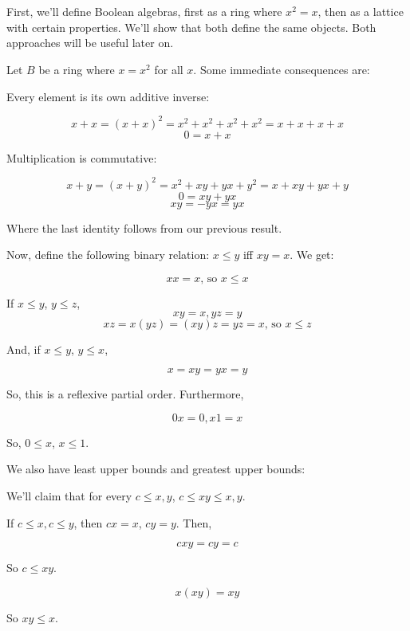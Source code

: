 \documentclass{article}
\title{}
\author{}
\date{}
\begin{document}
  \maketitle

  \section{}

    First, we'll define Boolean algebras, first as a ring where $x^2=x$, then as
    a lattice with certain properties. We'll show that both define the same
    objects. Both approaches will be useful later on.

    Let $B$ be a ring where $x = x^2$ for all $x$. Some immediate consequences
    are:

    Every element is its own additive inverse:

    \[ x + x = (x + x)^2 = x^2 + x^2 + x^2 + x^2 = x + x + x + x\]
    \[0 = x + x\]

    Multiplication is commutative:

    \[ x + y = (x + y)^2 = x^2 + xy + yx + y^2 = x + xy + yx + y\]
    \[0 = xy + yx\]
    \[xy = -yx = yx\]

    Where the last identity follows from our previous result.

    Now, define the following binary relation: $x \leq y$ iff $xy = x$. We get:

    \[xx = x \text{, so } x \leq x\]

    If $x \leq y$, $y \leq z$,
    \[xy = x, yz = y\]
    \[xz = x(yz) = (xy)z = yz = x \text{, so } x \leq z\]

    And, if $x \leq y$, $y \leq x$,

    \[x = xy = yx = y\]

    So, this is a reflexive partial order. Furthermore,

    \[0x = 0, x1 = x\]

    So, $0 \leq x$, $x \leq 1$.

    We also have least upper bounds and greatest upper bounds:

    We'll claim that for every $c \leq x,y$, $c \leq xy \leq x,y$.

    If $c \leq x, c \leq y$, then $cx = x$, $cy = y$. Then,

    \[ cxy = cy = c\]

    So $c \leq xy$.

    \[ x(xy) = xy\]

    So $xy \leq x$.
\end{document}
